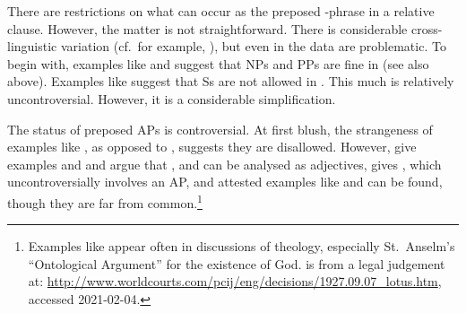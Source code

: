 \documentclass[output=paper,biblatex,babelshorthands,newtxmath,draftmode,colorlinks,citecolor=brown]{langscibook}
\begin{document}
\largerpage[2]
%
There are restrictions on what can occur as the preposed -phrase in a relative
clause. However, the matter is not straightforward. There is considerable cross-linguistic
variation (cf.\ for example, \citealt[Section~4.3]{Webelhuth92a-u}), but even in  the data are
problematic. To begin with, examples like  and  suggest that NPs and PPs
are fine in  (see also  above). Examples like 
suggest that Ss are not allowed in . This much is relatively
uncontroversial. However, it is a considerable simplification.
\begin{exe}\ex\begin{xlist}\label{x:rc-23}
 \label{x:rc-24}
 \label{x:rc-25}
 \label{x:rc-28}
\end{xlist}\end{exe}
The status of preposed APs is controversial. At first blush, the
strangeness of examples like , as opposed to , suggests
they are disallowed.
\eal
{}
\label{x:rc-240}
\label{x:rc-241}
\zl
However, \citet[311]{NanniStillings78} give examples  and 
and argue that , and  can be analysed as adjectives,
\citet[129]{Webelhuth92a-u} gives , which uncontroversially involves an AP,
and attested examples like  and  can be found, though they
are far from common.\footnote{Examples like  appear often in discussions of
  theology, especially St.\ Anselm's ``Ontological Argument'' for the existence of
  God.  is from a legal judgement at:
  \url{http://www.worldcourts.com/pcij/eng/decisions/1927.09.07_lotus.htm}, accessed 2021-02-04.}
\begin{exe}\ex\begin{xlist}\label{x:rc-230}
    \label{x:rc-231}
    \label{x:rc-232}
    \label{x:rc-233}
     \label{x:rc-234}
    \label{x:rc-235} 
  \end{xlist}\end{exe}
\end{document}
